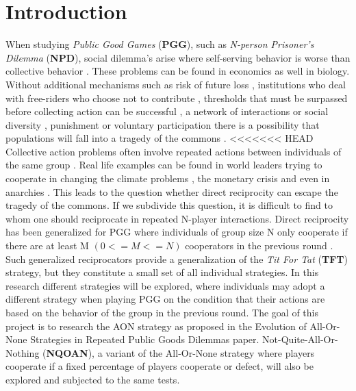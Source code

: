\documentclass[letterpaper]{article}
\begin{document}
\section{Introduction}
When studying \textit{Public Good Games}  (\textbf{PGG}), such as \textit{N-person Prisoner's Dilemma}  (\textbf{NPD}), social dilemma's arise where self-serving behavior is worse than collective behavior \citep{kollock1998social}. These problems can be found in economics as well in biology.
Without additional mechanisms such as risk of future loss \citep{santos2011risk}, institutions who deal with free-riders who choose not to contribute \citep{vasconcelos2013bottom,sigmund2010social}, thresholds that must be surpassed before collecting action can be successful \citep{pacheco2011evolutionary}, a network of interactions or social diversity \citep{wang2013interdependent,santos2008social}, punishment \citep{fehr2002altruistic,brandt2006punishing} or voluntary participation \citep{hauert2002volunteering} there is a possibility that populations will fall into a tragedy of the commons \citep{hardin1968tragedy}.
<<<<<<< HEAD
Collective action problems often involve repeated actions between individuals of the same group \citep{boyd1988evolution}. Real life examples can be found in world leaders trying to cooperate in changing the climate problems \citep{milinski2008collective,barrett2012climate}, the monetary crisis \citep{jacquet2001economic} and even in anarchies \citep{axelrod1985achieving}. This leads to the question whether direct reciprocity can escape the tragedy of the commons. If we subdivide this question, it is difficult to find to whom one should reciprocate in repeated N-player interactions. Direct reciprocity has been generalized for PGG where individuals of group size N only cooperate if there are at least M $(0<=M<=N)$ cooperators in the previous round \citep{van2012emergence,kurokawa2009emergence}. Such generalized reciprocators provide a generalization of the \textit{Tit For Tat}  (\textbf{TFT}) strategy, but they constitute a small set of all individual strategies.
In this research different strategies will be explored, where individuals may adopt a different strategy when playing PGG on the condition that their actions are based on the behavior of the group in the previous round.
The goal of this project is to research the AON strategy as proposed in the Evolution of All-Or-None Strategies in Repeated Public
Goods Dilemmas \citep{project} paper. Not-Quite-All-Or-Nothing (\textbf{NQOAN}), a variant of the All-Or-None strategy where players cooperate if a fixed percentage of players cooperate or defect, will also be explored and subjected to the same tests.
\end{document}
